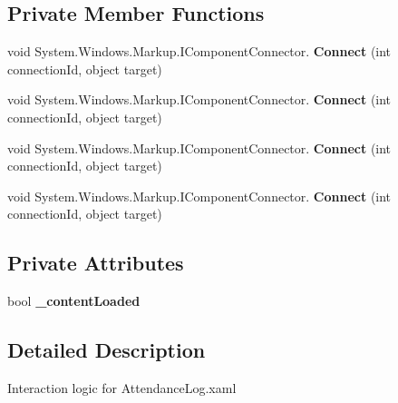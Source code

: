 \subsection*{Private Member Functions}
\begin{DoxyCompactItemize}
\item 
\mbox{\label{class_t_h_b___plugin___lesson_1_1_attendance_log_a5b9cdcd533bb9522e504d294f3fe6526}} 
void System.\+Windows.\+Markup.\+I\+Component\+Connector. {\bfseries Connect} (int connection\+Id, object target)
\item 
\mbox{\label{class_t_h_b___plugin___lesson_1_1_attendance_log_a5b9cdcd533bb9522e504d294f3fe6526}} 
void System.\+Windows.\+Markup.\+I\+Component\+Connector. {\bfseries Connect} (int connection\+Id, object target)
\item 
\mbox{\label{class_t_h_b___plugin___lesson_1_1_attendance_log_a5b9cdcd533bb9522e504d294f3fe6526}} 
void System.\+Windows.\+Markup.\+I\+Component\+Connector. {\bfseries Connect} (int connection\+Id, object target)
\item 
\mbox{\label{class_t_h_b___plugin___lesson_1_1_attendance_log_a5b9cdcd533bb9522e504d294f3fe6526}} 
void System.\+Windows.\+Markup.\+I\+Component\+Connector. {\bfseries Connect} (int connection\+Id, object target)
\end{DoxyCompactItemize}
\subsection*{Private Attributes}
\begin{DoxyCompactItemize}
\item 
\mbox{\label{class_t_h_b___plugin___lesson_1_1_attendance_log_a5b596611bf684dbca40d2f5cf7b8c709}} 
bool {\bfseries \+\_\+content\+Loaded}
\end{DoxyCompactItemize}


\subsection{Detailed Description}
Interaction logic for Attendance\+Log.\+xaml 

